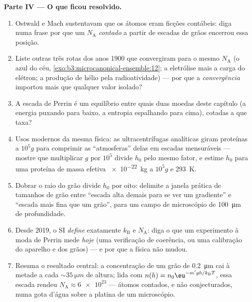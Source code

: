 \begin{problem}
\medskip\noindent\textbf{Parte IV --- O que ficou resolvido.}
\begin{enumerate}[resume]
  \item Ostwald e Mach sustentavam que os átomos eram ficções
        contábeis: diga numa frase por que um $N_{\text{A}}$
        \emph{contado} a partir de escadas de grãos encerrou essa
        posição.
  \item Liste outras três rotas dos anos 1900 que convergiram para o
        mesmo $N_{\text{A}}$ (o azul do céu,
        \cref{exo:b3:microcanonical-ensemble:12}; a eletrólise mais a
        carga do elétron; a produção de hélio pela radioatividade) ---
        por que a \emph{convergência} importou mais que qualquer valor
        isolado?
  \item A escada de Perrin é um equilíbrio entre quais duas moedas
        deste capítulo (a energia puxando para baixo, a entropia
        espalhando para cima), cotadas a que taxa?
  \item Usos modernos da mesma física: as ultracentrífugas analíticas
        giram proteínas a $10^5g$ para comprimir as ``atmosferas''
        delas em escadas mensuráveis --- mostre que multiplicar $g$ por
        $10^5$ divide $h_0$ pelo mesmo fator, e estime $h_0$ para uma
        proteína de massa efetiva \qty{e-22}{kg} a $10^5g$ e
        \qty{293}{K}.
  \item Dobrar o raio do grão divide $h_0$ por oito: delimite a janela
        prática de tamanhos de grão entre ``escada alta demais para se
        ver um gradiente'' e ``escada mais fina que um grão'', para um
        campo de microscópio de \qty{100}{\micro m} de profundidade.
  \item Desde 2019, o SI \emph{define} exatamente $k_{\text{B}}$ e
        $N_{\text{A}}$: diga o que um experimento à moda de Perrin mede
        \emph{hoje} (uma verificação de coerência, ou uma calibração do
        aparelho e dos grãos) --- e por que a física não mudou.
  \item Resuma o resultado central: a concentração de um grão de
        \qty{0.2}{\micro m} cai à metade a cada $\sim\qty{35}{\micro m}$
        de altura; lida com $n(h) = n_0\eu^{-m'gh/k_{\text{B}}T}$,
        essa escada rendeu $N_{\text{A}} \approx \num{6e23}$ --- átomos
        contados, e não conjecturados, numa gota d'água sobre a platina
        de um microscópio.
\end{enumerate}
\end{problem}
